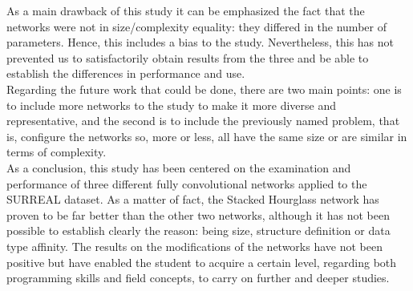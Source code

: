 As a main drawback of this study it can be emphasized the fact that the networks were not in size/complexity equality: they differed in the number of parameters. Hence, this includes a bias to the study. Nevertheless, this  has not prevented us to satisfactorily obtain results from the three and be able to establish the differences in performance and use.\\

Regarding the future work that could be done, there are two main points: one is to include more networks to the study to make it more diverse and representative, and the second is to include the previously named problem, that is, configure the networks so, more or less, all have the same size or are similar in terms of complexity.\\

As a conclusion, this study has been centered on the examination and performance of three different fully convolutional networks applied to the SURREAL dataset. As a matter of fact, the Stacked Hourglass network has proven to be far better than the other two networks, although it has not been possible to establish clearly the reason: being size, structure definition or data type affinity. The results on the modifications of the networks have not been positive but have enabled the student to acquire a certain level, regarding both programming skills and field concepts, to carry on further and deeper studies. \\